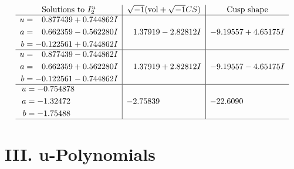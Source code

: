 \documentclass[1p]{elsarticle_modified}
\theoremstyle{definition}
\newcommand{\I}{\sqrt{-1}}
\begin{document}
$$\begin{array}{c|c|c}  
\text{Solutions to }I^u_{2}& \I (\text{vol} + \sqrt{-1}CS) & \text{Cusp shape}\\
 \hline 
\begin{aligned}
u &= \phantom{-}0.877439 + 0.744862 I \\
a &= \phantom{-}0.662359 - 0.562280 I \\
b &= -0.122561 + 0.744862 I\end{aligned}
 & \phantom{-}1.37919 - 2.82812 I & -9.19557 + 4.65175 I \\ \hline\begin{aligned}
u &= \phantom{-}0.877439 - 0.744862 I \\
a &= \phantom{-}0.662359 + 0.562280 I \\
b &= -0.122561 - 0.744862 I\end{aligned}
 & \phantom{-}1.37919 + 2.82812 I & -9.19557 - 4.65175 I \\ \hline\begin{aligned}
u &= -0.754878\phantom{ +0.000000I} \\
a &= -1.32472\phantom{ +0.000000I} \\
b &= -1.75488\phantom{ +0.000000I}\end{aligned}
 & -2.75839\phantom{ +0.000000I} & -22.6090\phantom{ +0.000000I}\\
 \hline 
 \end{array}$$\newpage
\newpage\renewcommand{\arraystretch}{1}
\centering \section*{ III. u-Polynomials}
\end{document}

